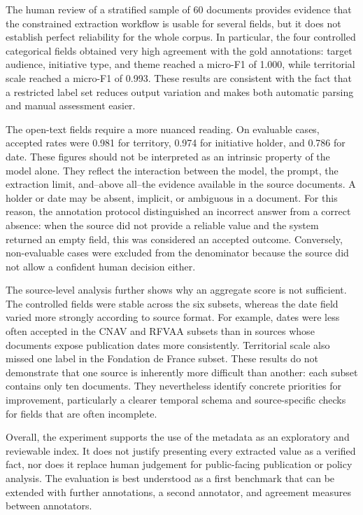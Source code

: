 The human review of a stratified sample of 60 documents provides evidence that
the constrained extraction workflow is usable for several fields, but it does
not establish perfect reliability for the whole corpus. In particular, the
four controlled categorical fields obtained very high agreement with the gold
annotations: target audience, initiative type, and theme reached a micro-F1 of
1.000, while territorial scale reached a micro-F1 of 0.993. These results are
consistent with the fact that a restricted label set reduces output variation
and makes both automatic parsing and manual assessment easier.

The open-text fields require a more nuanced reading. On evaluable cases,
accepted rates were 0.981 for territory, 0.974 for initiative holder, and
0.786 for date. These figures should not be interpreted as an intrinsic
property of the model alone. They reflect the interaction between the model,
the prompt, the extraction limit, and--above all--the evidence available in the
source documents. A holder or date may be absent, implicit, or ambiguous in a
document. For this reason, the annotation protocol distinguished an incorrect
answer from a correct absence: when the source did not provide a reliable value
and the system returned an empty field, this was considered an accepted
outcome. Conversely, non-evaluable cases were excluded from the denominator
because the source did not allow a confident human decision either.

The source-level analysis further shows why an aggregate score is not
sufficient. The controlled fields were stable across the six subsets, whereas
the date field varied more strongly according to source format. For example,
dates were less often accepted in the CNAV and RFVAA subsets than in sources
whose documents expose publication dates more consistently. Territorial scale
also missed one label in the Fondation de France subset. These results do not
demonstrate that one source is inherently more difficult than another: each
subset contains only ten documents. They nevertheless identify concrete
priorities for improvement, particularly a clearer temporal schema and
source-specific checks for fields that are often incomplete.

Overall, the experiment supports the use of the metadata as an exploratory and
reviewable index. It does not justify presenting every extracted value as a
verified fact, nor does it replace human judgement for public-facing
publication or policy analysis. The evaluation is best understood as a first
benchmark that can be extended with further annotations, a second annotator,
and agreement measures between annotators.

